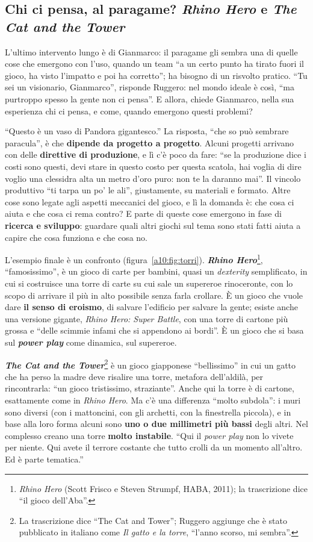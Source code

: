 \subsection{Chi ci pensa, al paragame? \emph{Rhino Hero} e \emph{The Cat and the Tower}}

L'ultimo intervento lungo è di Gianmarco: il paragame gli sembra una di quelle cose che
emergono con l'uso, quando un team ``a un certo punto ha tirato fuori il gioco, ha visto
l'impatto e poi ha corretto''; ha bisogno di un risvolto pratico. ``Tu sei un visionario,
Gianmarco'', risponde Ruggero: nel mondo ideale è così, ``ma purtroppo spesso la gente
non ci pensa''. E allora, chiede Gianmarco, nella sua esperienza chi ci pensa, e come,
quando emergono questi problemi?

``Questo è un vaso di Pandora gigantesco.'' La risposta, ``che so può sembrare
paracula'', è che \textbf{dipende da progetto a progetto}. Alcuni progetti arrivano con
delle \textbf{direttive di produzione}, e lì c'è poco da fare: ``se la produzione dice i
costi sono questi, devi stare in questo costo per questa scatola, hai voglia di dire
voglio una clessidra alta un metro d'oro puro: non te la daranno mai''. Il vincolo
produttivo ``ti tarpa un po' le ali'', giustamente, su materiali e formato. Altre cose
sono legate agli aspetti meccanici del gioco, e lì la domanda è: che cosa ci aiuta e che
cosa ci rema contro? E parte di queste cose emergono in fase di \textbf{ricerca e
sviluppo}: guardare quali altri giochi sul tema sono stati fatti aiuta a capire che cosa
funziona e che cosa no.

L'esempio finale è un confronto (figura~\ref{a10:fig:torri}). \textbf{\emph{Rhino
Hero}}\footnote{\emph{Rhino Hero} (Scott Frisco e Steven Strumpf, HABA, 2011); la
trascrizione dice ``il gioco dell'Aba''.}, ``famosissimo'', è un gioco di carte per
bambini, quasi un \emph{dexterity} semplificato, in cui si costruisce una torre di carte
su cui sale un supereroe rinoceronte, con lo scopo di arrivare il più in alto possibile
senza farla crollare. È un gioco che vuole dare \textbf{il senso di eroismo}, di salvare
l'edificio per salvare la gente; esiste anche una versione gigante, \emph{Rhino Hero:
Super Battle}, con una torre di cartone più grossa e ``delle scimmie infami che si
appendono ai bordi''. È un gioco che si basa sul \textbf{\emph{power play}} come
dinamica, sul supereroe.

\textbf{\emph{The Cat and the Tower}}\footnote{La trascrizione dice ``The Cat and
Tower''; Ruggero aggiunge che è stato pubblicato in italiano come \emph{Il gatto e la
torre}, ``l'anno scorso, mi sembra''.} è un gioco giapponese ``bellissimo'' in cui un
gatto che ha perso la madre deve risalire una torre, metafora dell'aldilà, per
rincontrarla: ``un gioco tristissimo, straziante''. Anche qui la torre è di cartone,
esattamente come in \emph{Rhino Hero}. Ma c'è una differenza ``molto subdola'': i muri
sono diversi (con i mattoncini, con gli archetti, con la finestrella piccola), e in base
alla loro forma alcuni sono \textbf{uno o due millimetri più bassi} degli altri. Nel
complesso creano una torre \textbf{molto instabile}. ``Qui il \emph{power play} non lo
vivete per niente. Qui avete il terrore costante che tutto crolli da un momento
all'altro. Ed è parte tematica.''

